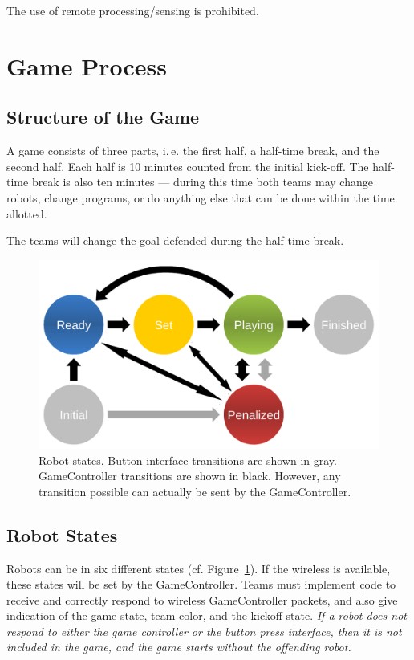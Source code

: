 \documentclass[12pt]{article}
\newcommand{\ie}{\mbox{i.\,e.}\xspace}
\newcommand{\cf}{\mbox{cf.}\xspace}
\begin{document}
The use of remote processing/sensing is prohibited.


\newpage


\section{Game Process}
\label{sec:game_process}

\subsection{Structure of the Game}
\label{sec:game_struct}

A game consists of three parts, \ie the first half, a half-time break, and the second half. Each half is 10 minutes counted from the initial kick-off. The half-time break is also ten minutes --- during this time both teams may change robots, change programs, or do anything else that can be done within the time allotted. 

The teams will change the goal defended during the half-time break.

\begin{figure}[t]
\centerline{\includegraphics[width=0.9\columnwidth]{figs/states.pdf}}
\caption{Robot states. Button interface transitions are shown in gray. GameController transitions are shown in black. However, any transition possible can actually be sent by the GameController.}
\label{fig:robot_states}
\end{figure}

\subsection{Robot States}
\label{sec:robot_states}

Robots can be in six different states (\cf Figure~\ref{fig:robot_states}). If the wireless is available, these states will be set by the GameController. Teams must implement code to receive and correctly respond to wireless GameController packets, and also give indication of the game state, team color, and the kickoff state.
\emph{If a robot does not respond to either the game controller or the button press interface, then it is not included in the game, and the game starts without the offending robot.}
\end{document}
